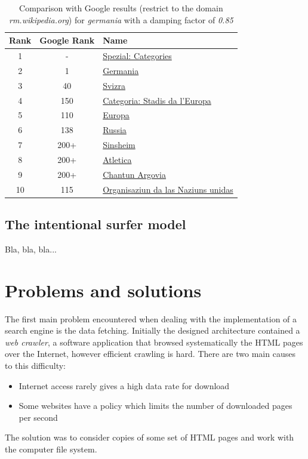 \documentclass[pdftex,12pt,a4paper]{article}
\begin{document}
\begin{table}[H]
\centering
\begin{tabular}{ | c | c | l | }
\hline
Rank & Google Rank & Name \\ \hline
1 & - & \href{http://rm.wikipedia.org/wiki/Spezial:Categories}{Spezial: Categories} \\ \hline
2 & 1 & \href{http://rm.wikipedia.org/wiki/Germania}{Germania} \\ \hline
3 & 40 & \href{http://rm.wikipedia.org/wiki/Svizra}{Svizra} \\ \hline
4 & 150 & \href{http://rm.wikipedia.org/wiki/Categoria:Stadis_da_l'Europa}{Categoria: Stadis da l'Europa} \\ \hline
5 & 110 & \href{http://rm.wikipedia.org/wiki/Europa}{Europa} \\ \hline
6 & 138 & \href{http://rm.wikipedia.org/wiki/Russia}{Russia} \\ \hline
7 & 200+ & \href{http://rm.wikipedia.org/wiki/Sinsheim}{Sinsheim} \\ \hline
8 & 200+& \href{http://rm.wikipedia.org/wiki/Atletica}{Atletica} \\ \hline
9 & 200+ & \href{http://rm.wikipedia.org/wiki/Chantun_Argovia}{Chantun Argovia} \\ \hline
10 & 115 & \href{http://rm.wikipedia.org/wiki/Organisaziun_da_las_Naziuns_unidas}{Organisaziun da las Naziuns unidas} \\ \hline
\end{tabular}
\caption{Comparison with Google results (restrict to the domain \emph{rm.wikipedia.org}) for \emph{germania} with a damping factor of \emph{0.85}}
\label{table_comparison}
\end{table}


\subsection{The intentional surfer model}
Bla, bla, bla...


\section{Problems and solutions}

The first main problem encountered when dealing with the implementation of a search engine is the data fetching. Initially the designed architecture contained a \emph{web crawler}, a software application that browsed systematically the HTML pages over the Internet, however efficient crawling is hard.
There are two main causes to this difficulty:
\begin{itemize}
\item Internet access rarely gives a high data rate for download
\item Some websites have a policy which limits the number of downloaded pages per second
\end{itemize}
The solution was to consider copies of some set of HTML pages and work with the computer file system.
\end{document}
